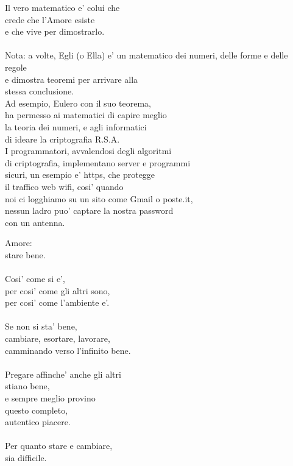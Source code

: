 \begin{haiku}
Il vero matematico e' colui che\\
crede che l'Amore esiste\\
e che vive per dimostrarlo.\\
\leavevmode\\
Nota: a volte, Egli (o Ella) e' un
matematico dei numeri, delle forme e delle regole\\
e dimostra teoremi per arrivare alla\\
stessa conclusione.\\
Ad esempio, Eulero con il suo teorema,\\
ha permesso ai matematici di capire meglio\\
la teoria dei numeri, e agli informatici\\
di ideare la criptografia R.S.A.\\
I programmatori, avvalendosi degli algoritmi\\
di criptografia, implementano server e programmi\\
sicuri, un esempio e' https, che protegge\\
il traffico web wifi, cosi' quando\\
noi ci logghiamo su un sito come Gmail o poste.it,\\
nessun ladro puo' captare la nostra password\\
con un antenna.\\
\end{haiku}

\begin{haiku}
    Amore:\\
    stare bene.\\
    \leavevmode\\
    Cosi' come si e',\\
    per cosi' come gli altri sono,\\
    per cosi' come l'ambiente e'.\\
    \leavevmode\\
    Se non si sta' bene,\\
    cambiare, esortare, lavorare,\\
    camminando verso l'infinito bene.\\
    \leavevmode\\
    Pregare affinche' anche gli altri\\
    stiano bene,\\
    e sempre meglio provino\\
    questo completo,\\
    autentico piacere.\\
    \leavevmode\\
    Per quanto stare e cambiare,\\
    sia difficile.\\
\end{haiku}


